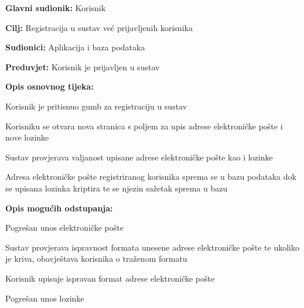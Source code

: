 				
				\noindent {}
				\begin{packed_item}
					
					\item \textbf{Glavni sudionik: }Korisnik
					\item  \textbf{Cilj:} Registracija u sustav već prijavljenih korisnika
					\item  \textbf{Sudionici:} Aplikacija i baza podataka
					\item  \textbf{Preduvjet:} Korisnik je prijavljen u sustav
					\item  \textbf{Opis osnovnog tijeka:}
					
					\item[] \begin{packed_enum}
						
						\item Korisnik je pritisnuo gumb za registraciju u sustav
						\item Korisniku se otvara nova stranica s poljem za upis adrese elektroničke pošte i nove lozinke
						\item Sustav provjerava valjanost upisane adrese elektroničke pošte kao i lozinke
						\item Adresa elektroničke pošte registriranog korisnika sprema se u bazu podataka dok se upisana lozinka kriptira te se njezin sažetak sprema u bazu 

					\end{packed_enum}
					
					\item  \textbf{Opis mogućih odstupanja:}
					
					\item[] \begin{packed_item}
						
						\item[3.a] Pogrešan unos elektroničke pošte
						\item[] \begin{packed_enum}
							
							\item Sustav provjerava ispravnost formata unesene adrese elektroničke pošte te ukoliko je kriva, obavještava korisnika o traženom formatu
							\item Korisnik upisuje ispravan format adrese elektroničke pošte
							
						\end{packed_enum}
						\item[3.b] Pogrešan unos lozinke
						\item[] \begin{packed_enum}
							

\end{packed_enum}
\end{packed_item}
\end{packed_item}
